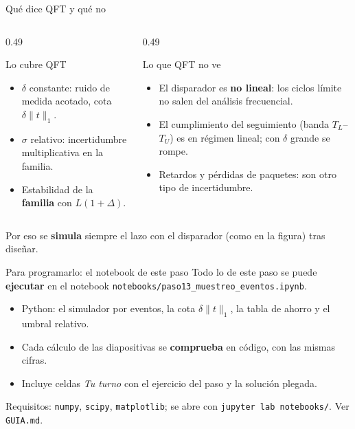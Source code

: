 \documentclass[aspectratio=169,11pt]{beamer}
\begin{document}
\begin{frame}{Qué dice QFT y qué no}
  \small
  \begin{columns}[T]
  \begin{column}{0.49\textwidth}
    \begin{block}{Lo cubre QFT}
      \begin{itemize}
        \item $\delta$ constante: ruido de medida acotado, cota $\delta\|t\|_1$.
        \item $\sigma$ relativo: incertidumbre multiplicativa en la familia.
        \item Estabilidad de la \textbf{familia} con $L(1+\Delta)$.
      \end{itemize}
    \end{block}
  \end{column}
  \begin{column}{0.49\textwidth}
    \begin{alertblock}{Lo que QFT no ve}
      \begin{itemize}
        \item El disparador es \textbf{no lineal}: los ciclos límite no salen del análisis frecuencial.
        \item El cumplimiento del seguimiento (banda $T_L$--$T_U$) es en régimen lineal; con $\delta$ grande se rompe.
        \item Retardos y pérdidas de paquetes: son otro tipo de incertidumbre.
      \end{itemize}
    \end{alertblock}
  \end{column}
  \end{columns}
  \vspace{4pt}
  Por eso se \textbf{simula} siempre el lazo con el disparador (como en la figura) tras diseñar.
\end{frame}

\begin{frame}{Para programarlo: el notebook de este paso}
  \small
  Todo lo de este paso se puede \textbf{ejecutar} en el notebook \texttt{notebooks/paso13\_muestreo\_eventos.ipynb}.
  \begin{itemize}
    \item Python: el simulador por eventos, la cota $\delta\|t\|_1$, la tabla de ahorro y el umbral relativo.
    \item Cada cálculo de las diapositivas se \textbf{comprueba} en código, con las mismas cifras.
    \item Incluye celdas \emph{Tu turno} con el ejercicio del paso y la solución plegada.
  \end{itemize}
  \footnotesize Requisitos: \texttt{numpy}, \texttt{scipy}, \texttt{matplotlib}; se abre con \texttt{jupyter lab notebooks/}. Ver \texttt{GUIA.md}.
\end{frame}
\end{document}
